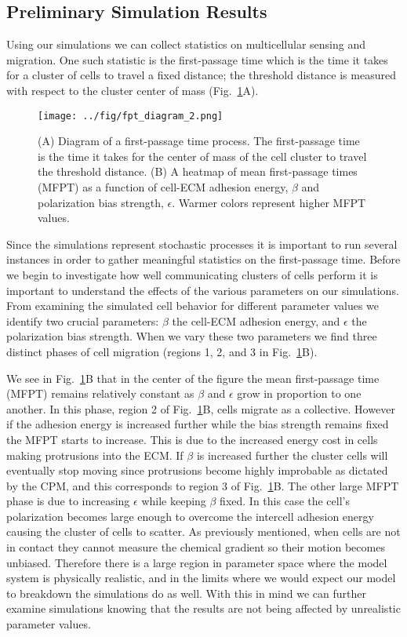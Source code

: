 \documentclass[phys,prelim]{puthesis}
\begin{document}
\subsection{Preliminary Simulation Results}

Using our simulations we can collect statistics on multicellular sensing and migration. One such statistic is the first-passage time which is the time it takes for a cluster of cells to travel a fixed distance; the threshold distance is measured with respect to the cluster center of mass (Fig.\ \ref{fig:fpt}A).

\begin{figure}[ht]
    \centering
        \texttt{[image: ../fig/fpt\_diagram\_2.png]}
    \caption{(A) Diagram of a first-passage time process. The first-passage time is the time it takes for the center of mass of the cell cluster to travel the threshold distance. (B) A heatmap of mean first-passage times (MFPT) as a function of cell-ECM adhesion energy, $\beta$ and polarization bias strength, $\epsilon$. Warmer colors represent higher MFPT values.} \label{fig:fpt}
\end{figure}

Since the simulations represent stochastic processes it is important to run several instances in order to gather meaningful statistics on the first-passage time. Before we begin to investigate how well communicating clusters of cells perform it is important to understand the effects of the various parameters on our simulations. From examining the simulated cell behavior for different parameter values we identify two crucial parameters: $\beta$ the cell-ECM adhesion energy, and $\epsilon$ the polarization bias strength. When we vary these two parameters we find three distinct phases of cell migration (regions 1, 2, and 3 in Fig.\ \ref{fig:fpt}B).

We see in Fig.\ \ref{fig:fpt}B that in the center of the figure the mean first-passage time (MFPT) remains relatively constant as $\beta$ and $\epsilon$ grow in proportion to one another. In this phase, region 2 of Fig.\ \ref{fig:fpt}B, cells migrate as a collective. However if the adhesion energy is increased further while the bias strength remains fixed the MFPT starts to increase. This is due to the increased energy cost in cells making protrusions into the ECM. If $\beta$ is increased further the cluster cells will eventually stop moving since protrusions become highly improbable as dictated by the CPM, and this corresponds to region 3 of Fig.\ \ref{fig:fpt}B. The other large MFPT phase is due to increasing $\epsilon$ while keeping $\beta$ fixed. In this case the cell's polarization becomes large enough to overcome the intercell adhesion energy causing the cluster of cells to scatter. As previously mentioned, when cells are not in contact they cannot measure the chemical gradient so their motion becomes unbiased. Therefore there is a large region in parameter space where the model system is physically realistic, and in the limits where we would expect our model to breakdown the simulations do as well. With this in mind we can further examine simulations knowing that the results are not being affected by unrealistic parameter values.
\end{document}
